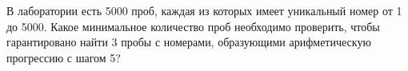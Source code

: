 \question 
В лаборатории есть 5000 проб, каждая из которых имеет уникальный номер от 1 до 5000. Какое минимальное количество проб необходимо проверить, чтобы гарантировано найти 3 пробы с номерами, образующими арифметическую прогрессию с шагом 5?